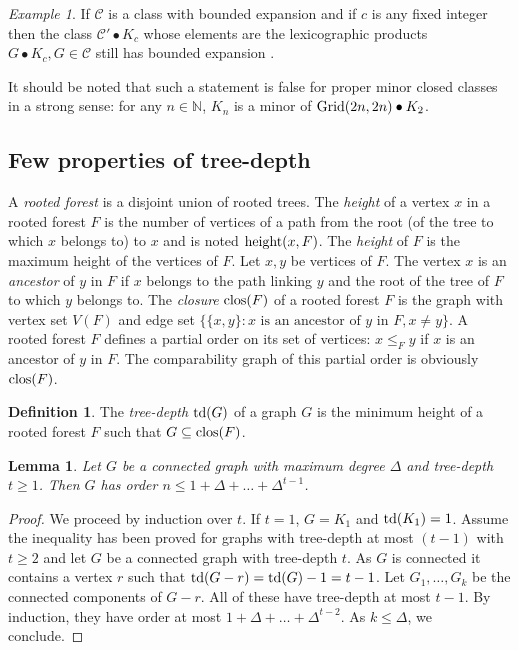\documentclass[a4paper]{amsart}
\newtheorem{lemma}[theorem]{Lemma}
\theoremstyle{definition}
\newtheorem{definition}{Definition}[section]
\theoremstyle{remark}
\newtheorem{example}{Example}
\newcommand{\field}[1]{\mathbb{#1}}
\newcommand{\bbbn}{\field{N}}
\DeclareMathOperator\depth{{\rm td}}
\DeclareMathOperator\clos{{\rm clos}}
\DeclareMathOperator\height{{\rm height}}
\begin{document}
\begin{example}
If $\mathcal C$ is a class with bounded expansion and
if $c$ is any fixed integer then the class $\mathcal C'\bullet K_c$
whose elements are the lexicographic products $G\bullet K_c,
G\in\mathcal C$ still has bounded expansion  \cite{POMNI}.

 It should be noted that
such a statement is false for proper minor closed classes in a strong
sense: for any $n\in\bbbn$, $K_n$ is a minor of ${\rm
Grid}(2n,2n)\bullet K_2$.
\end{example}

\subsection{Few properties of tree-depth}

A {\em rooted forest} is a disjoint union of rooted trees.
The {\em height} of a vertex $x$ in a rooted
forest $F$ is the number of vertices of a
path from the root (of the tree to which $x$ belongs to) to $x$ and is noted $\height(x,F)$.
The {\em height} of $F$ is the maximum height of the vertices of $F$.
Let $x,y$ be vertices of $F$. The vertex $x$ is an {\em ancestor} of $y$ in $F$ if $x$ belongs to
the path linking $y$ and the root of the tree of $F$ to which $y$ belongs to.
The {\em closure} $\clos(F)$ of a rooted forest $F$ is the graph with
vertex set $V(F)$ and edge set $\{\{x,y\}: x\text{ is an ancestor of
  }y\text{ in }F, x \neq y\}$. A rooted forest $F$ defines a partial order on its set of vertices:
$x\leq_F y$ if $x$ is an ancestor of $y$ in $F$.
The comparability graph of this partial order is obviously $\clos(F)$.

\begin{definition}
The {\em tree-depth} $\depth(G)$ of a graph $G$ is the minimum height
of a rooted forest $F$ such that $G\subseteq\clos(F)$.
\end{definition}

\begin{lemma}
\label{lem:fin}
Let $G$ be a connected graph with maximum degree $\Delta$ and
tree-depth $t\geq 1$.
Then $G$ has order $n\leq 1+\Delta+\dots+\Delta^{t-1}$.
\end{lemma}
\begin{proof}
We proceed by induction over $t$. If $t=1$, $G=K_1$ and
$\depth(K_1)=1$. Assume the inequality has been proved for graphs with
tree-depth at most $(t-1)$ with $t\geq 2$ and let $G$ be a connected
graph with tree-depth $t$.
As $G$ is connected it contains a vertex $r$ such that
$\depth(G-r)=\depth(G)-1=t-1$. Let $G_1,\dots,G_k$ be the connected
components of $G-r$. All of these have tree-depth at most $t-1$. By
induction, they have order at most $1+\Delta+\dots+\Delta^{t-2}$.
As $k\leq\Delta$, we conclude.
\end{proof}
\end{document}
